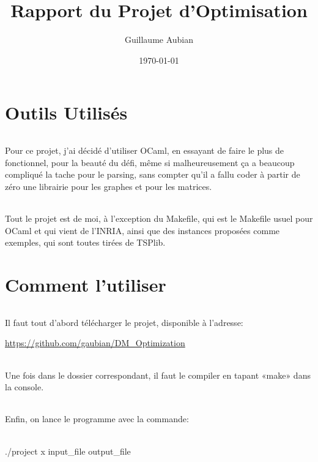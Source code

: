 \documentclass[a4paper]{article}
\title{Rapport du Projet d'Optimisation}
\author{Guillaume Aubian}
\date{\today}
\begin{document}
\maketitle

\tableofcontents

\newpage
\part{Outils Utilisés}

\paragraph{}
Pour ce projet, j'ai décidé d'utiliser OCaml, en essayant de faire le plus de fonctionnel, pour la beauté du défi, même si malheureusement ça a beaucoup compliqué la tache pour le parsing, sans compter qu'il a fallu coder à partir de zéro une librairie pour les graphes et pour les matrices.

\paragraph{}
Tout le projet est de moi, à l'exception du Makefile, qui est le Makefile usuel pour OCaml et qui vient de l'INRIA, ainsi que des instances proposées comme exemples, qui sont toutes tirées de TSPlib.

\part{Comment l'utiliser}

\paragraph{}
Il faut tout d'abord télécharger le projet, disponible à l'adresse:

\url{https://github.com/gaubian/DM_Optimization}

\paragraph{}
Une fois dans le dossier correspondant, il faut le compiler en tapant «make» dans la console.

\paragraph{}
Enfin, on lance le programme avec la commande:

\paragraph{}
./project x input\_file output\_file
\end{document}

